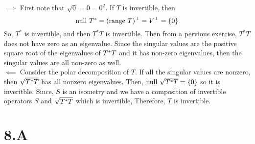\documentclass[10pt, twocolumn]{article}
\begin{document}
\begin{q}[13]
    $ \implies $
    First note that $ \sqrt{0} = 0 = 0^2 $.
    If $ T $ is invertible, then $$ \text{null } T^* = (\text{range } T)^\perp = V^\perp = \{0\} $$
    So, $ T^* $ is invertible, and then $ T^*T $ is invertible.  
    Then from a pervious exercise, $ T^* T $ does not have zero as an eigenvalue.
    Since the singular values are the positive square root of the eigenvalues of $ T^* T $ and it has non-zero eigenvalues, 
    then the singular values are all non-zero as well. \\
    $ \impliedby $ Consider the polar decomposition of $ T $. 
    If all the singular values are nonzero, then $ \sqrt{T^* T} $ has all nonzero eigenvalues.
    Then, $ \text{null } \sqrt{T^* T} = \{0\} $ so it is inveritble. 
    Since, $ S $ is an isometry and we have a composition of invertible operators $ S $ and $ \sqrt{T^* T} $ which is invertible, 
    Therefore, $ T $ is invertible.
\end{q}

\section{8.A}

\begin{q}[3]
     
\end{q}

\begin{q}[4]
    
\end{q}

\begin{q}[6]
    
\end{q}

\begin{q}[8]
    
\end{q}

\begin{q}[9]
    
\end{q}

\begin{q}[11]
    
\end{q}

\begin{q}[14]
    
\end{q}
\end{document}
